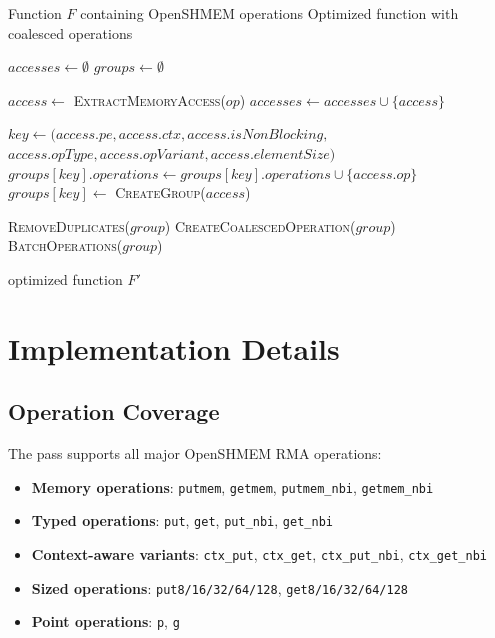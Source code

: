 \documentclass{article}
\begin{document}
\begin{algorithm}
\caption{OpenSHMEM Message Aggregation}
\label{alg:message_aggregation}
\begin{algorithmic}[1]
\REQUIRE Function $F$ containing OpenSHMEM operations
\ENSURE Optimized function with coalesced operations

\STATE $accesses \leftarrow \emptyset$
\STATE $groups \leftarrow \emptyset$

        \STATE $access \leftarrow$ \textsc{ExtractMemoryAccess}($op$)
        \STATE $accesses \leftarrow accesses \cup \{access\}$
    \ENDIF
\ENDFOR

    \STATE $key \leftarrow (access.pe, access.ctx, access.isNonBlocking,$
    \STATE \hspace{2em} $access.opType, access.opVariant, access.elementSize)$
        \STATE $groups[key].operations \leftarrow groups[key].operations \cup \{access.op\}$
    \ELSE
        \STATE $groups[key] \leftarrow$ \textsc{CreateGroup}($access$)
    \ENDIF
\ENDFOR

        \STATE \textsc{RemoveDuplicates}($group$)
        \STATE \textsc{CreateCoalescedOperation}($group$)
        \STATE \textsc{BatchOperations}($group$)
    \ENDIF
\ENDFOR

\RETURN optimized function $F'$
\end{algorithmic}
\end{algorithm}

\section{Implementation Details}

\subsection{Operation Coverage}
The pass supports all major OpenSHMEM RMA operations:
\begin{itemize}
\item \textbf{Memory operations}: \texttt{putmem}, \texttt{getmem}, \texttt{putmem\_nbi}, \texttt{getmem\_nbi}
\item \textbf{Typed operations}: \texttt{put}, \texttt{get}, \texttt{put\_nbi}, \texttt{get\_nbi}
\item \textbf{Context-aware variants}: \texttt{ctx\_put}, \texttt{ctx\_get}, \texttt{ctx\_put\_nbi}, \texttt{ctx\_get\_nbi}
\item \textbf{Sized operations}: \texttt{put8/16/32/64/128}, \texttt{get8/16/32/64/128}
\item \textbf{Point operations}: \texttt{p}, \texttt{g}
\end{itemize}
\end{document}

